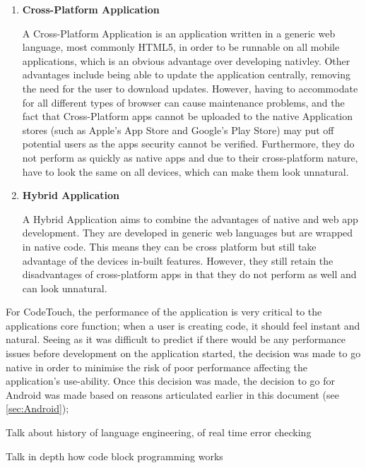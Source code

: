 \documentclass[ %
                    author={Jonathan Rankin},
                supervisor={Dr. David May, Dr. Ian Holyer},
                    degree={MEng},
                     title={CodeTouch},
                  subtitle={A Revolutionary Way To Program Real Code On Touch Screen Devices},
                      type={enterprise},
                      year={2015 } ]{dissertation}
\begin{document}
\begin{enumerate}
\item \textbf{Cross-Platform Application}
\begin{itemize}
A Cross-Platform Application is an application written in a generic web language, most commonly HTML5, in order to be runnable on all mobile applications, which is an obvious advantage over developing nativley.  Other advantages include being able to update the application centrally, removing the need for the user to download updates.  However, having to accommodate for all different types of browser can cause maintenance problems, and the fact that Cross-Platform apps cannot be uploaded to the native Application stores (such as Apple's App Store and Google's Play Store) may put off potential users as the apps security cannot be verified. Furthermore, they do not perform as quickly as native apps and due to their cross-platform nature, have to look the same on all devices, which can make them look unnatural. 
\end{itemize}
\item \textbf {Hybrid Application}
\begin{itemize}
A Hybrid Application aims to  combine the advantages of native and web app development. They are developed in generic web languages but are wrapped in native code. This means they can be cross platform but still take advantage of the devices in-built features. However, they still retain the disadvantages of cross-platform apps in that they do not perform as well and can look unnatural.
\end{itemize}
\end{enumerate}

For CodeTouch, the performance of the application is very critical to the applications core function; when a user is creating code, it should feel instant and natural. Seeing as it was difficult to predict if there would be any performance issues before development on the application started, the decision was made to go native in order to minimise the risk of poor performance affecting the application's use-ability. Once this decision was made, the decision to go for Android was made based on reasons articulated earlier in this document (see \ref{sec:Android});









Talk about history of language engineering, of real time error checking


Talk in depth how code block programming works
\end{document}

